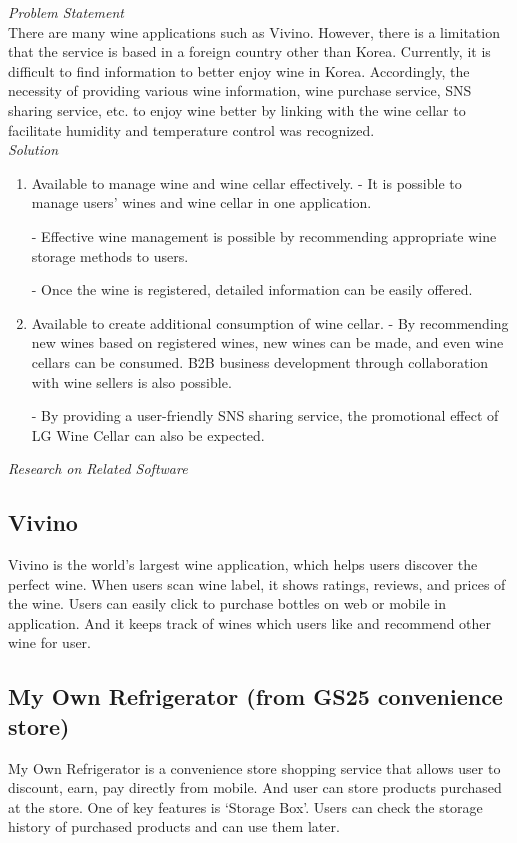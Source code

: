 \documentclass[conference]{IEEEtran}
\numberwithin{figure}{subsection}
\begin{document}
\noindent\textit{Problem Statement}\\
\indent There are many wine applications such as Vivino. However, there is a limitation that the service is based in a foreign country other than Korea. Currently, it is difficult to find information to better enjoy wine in Korea. Accordingly, the necessity of providing various wine information, wine purchase service, SNS sharing service, etc. to enjoy wine better by linking with the wine cellar to facilitate humidity and temperature control was recognized.\\ 
  
  
  
\noindent\textit{Solution}
\begin{enumerate}
\item Available to manage wine and wine cellar effectively. 
- It is possible to manage users' wines and wine cellar in one
application.

- Effective wine management is possible by recommending
appropriate wine storage methods to users.

- Once the wine is registered, detailed information can be
easily offered.

\item Available to create additional consumption of wine cellar. 
- By recommending new wines based on registered wines,
new wines can be made, and even wine cellars can be
consumed. B2B business development through collaboration
with wine sellers is also possible.

- By providing a user-friendly SNS sharing service, the
promotional effect of LG Wine Cellar can also be expected.\\
\end{enumerate}


\noindent \textit{Research on Related Software}
\subsection{Vivino}
Vivino is the world’s largest wine application, which helps users discover the perfect wine. When users scan wine label, it shows ratings, reviews, and prices of the wine. Users can easily click to purchase bottles on web or mobile in application. And it keeps track of wines which users like and recommend other wine for user.
  
\subsection{My Own Refrigerator (from GS25 convenience store)}
My Own Refrigerator is a convenience store shopping service that allows user to discount, earn, pay directly from mobile. And user can store products purchased at the store. One of key features is ‘Storage Box’. Users can check the storage history of purchased products and can use them later.
\end{document}
